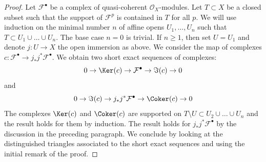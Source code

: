 \begin{proof}
\medskip\noindent
Let $\mathcal{F}^\bullet$ be a complex of quasi-coherent
$\mathcal{O}_X$-modules. Let $T \subset X$ be a closed subset
such that the support of $\mathcal{F}^p$ is contained in $T$
for all $p$. We will use induction on the minimal number $n$
of affine opens $U_1, \ldots, U_n$ such that
$T \subset U_1 \cup \ldots \cup U_n$. The base case $n = 0$ is trivial.
If $n \geq 1$, then set $U = U_1$ and denote $j : U \to X$ the
open immersion as above. We consider the map of complexes
$c : \mathcal{F}^\bullet \to j_*j^*\mathcal{F}^\bullet$.
We obtain two short exact sequences of complexes:
$$
0 \to \Ker(c) \to \mathcal{F}^\bullet \to \Im(c) \to 0
$$
and
$$
0 \to \Im(c) \to j_*j^*\mathcal{F}^\bullet \to \Coker(c) \to 0
$$
The complexes $\Ker(c)$ and $\Coker(c)$ are supported
on $T \setminus U \subset U_2 \cup \ldots \cup U_n$ and the result
holds for them by induction. The result holds for
$j_*j^*\mathcal{F}^\bullet$ by the discussion in the preceding
paragraph. We conclude by looking at the distinguished triangles
associated to the short exact sequences and using the initial
remark of the proof.
\end{proof}